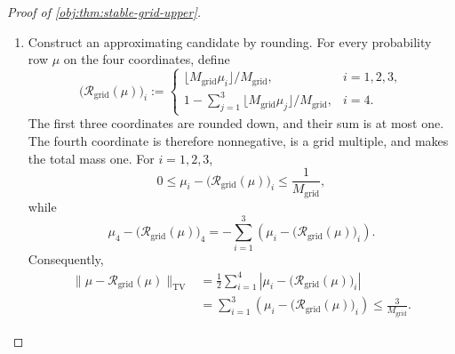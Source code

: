 \documentclass[11pt]{article}
\begin{document}
\begin{proof}[Proof of \cref{obj:thm:stable-grid-upper}]
\begin{enumerate}
Write the selected quantities as in \cref{obj:def:stable-grid-estimator}:
\[
(\nu_*,R_*,r_*)\in\mathcal C_{M_{\mathrm{grid}}},
\qquad
P_*:=P(R_*),
\qquad
\widehat\theta_T=\pi(P_*)r_*.
\]
The experiment's class conditions give a row-stochastic \(P_e\), probability rows \(d_b,d_e\), and a unit-range reward vector:
\[
P_e(i,j)\ge0,\quad \sum_jP_e(i,j)=1,
\qquad
d_b(i),d_e(i)\ge0,\quad \sum_id_b(i)=\sum_id_e(i)=1,
\]
\[
d_eP_e=d_e,
\qquad
0\le r_e(i)\le1.
\]
Applying \cref{obj:ass:target-contraction} to point masses gives
\[
\delta(P_e)
=
\max_{i,j}\frac12\sum_s|P_e(i,s)-P_e(j,s)|
\le\alpha.
\]
Together with \(\theta=d_er_e\) from \cref{obj:def:target-value}, these facts discharge the hypotheses of \cref{obj:lem:pair-polynomial-modulus}. Its value bound is
\[
\begin{aligned}
|\widehat\theta_T-\theta|
&\le
B_\alpha
\max_{0\le k\le6}
|\nu_*P_*^kr_*-d_bP_e^kr_e|\\
&=
B_\alpha
\max_{0\le k\le6}
|\nu_*P_*^kr_*-m_k|.
\end{aligned}
\]

\item Construct an approximating candidate by rounding. For every probability row \(\mu\) on the four coordinates, define
\[
\bigl(\mathcal R_{\mathrm{grid}}(\mu)\bigr)_i
:=
\begin{cases}
\lfloor M_{\mathrm{grid}}\mu_i\rfloor/M_{\mathrm{grid}},
 &i=1,2,3,\\[2mm]
1-\displaystyle\sum_{j=1}^{3}
 \lfloor M_{\mathrm{grid}}\mu_j\rfloor/M_{\mathrm{grid}},
 &i=4.
\end{cases}
\]
The first three coordinates are rounded down, and their sum is at most one. The fourth coordinate is therefore nonnegative, is a grid multiple, and makes the total mass one. For \(i=1,2,3\),
\[
0\le
\mu_i-\bigl(\mathcal R_{\mathrm{grid}}(\mu)\bigr)_i
\le\frac1{M_{\mathrm{grid}}},
\]
while
\[
\mu_4-\bigl(\mathcal R_{\mathrm{grid}}(\mu)\bigr)_4
=
-\sum_{i=1}^{3}
 \left(\mu_i-\bigl(\mathcal R_{\mathrm{grid}}(\mu)\bigr)_i\right).
\]
Consequently,
\[
\begin{aligned}
\|\mu-\mathcal R_{\mathrm{grid}}(\mu)\|_{\mathrm{TV}}
&=
\frac12\sum_{i=1}^{4}
 \left|\mu_i-\bigl(\mathcal R_{\mathrm{grid}}(\mu)\bigr)_i\right|\\
&=
\sum_{i=1}^{3}
 \left(\mu_i-\bigl(\mathcal R_{\mathrm{grid}}(\mu)\bigr)_i\right)
\le\frac3{M_{\mathrm{grid}}}.
\end{aligned}
\]


\end{enumerate}
\end{proof}
\end{document}

